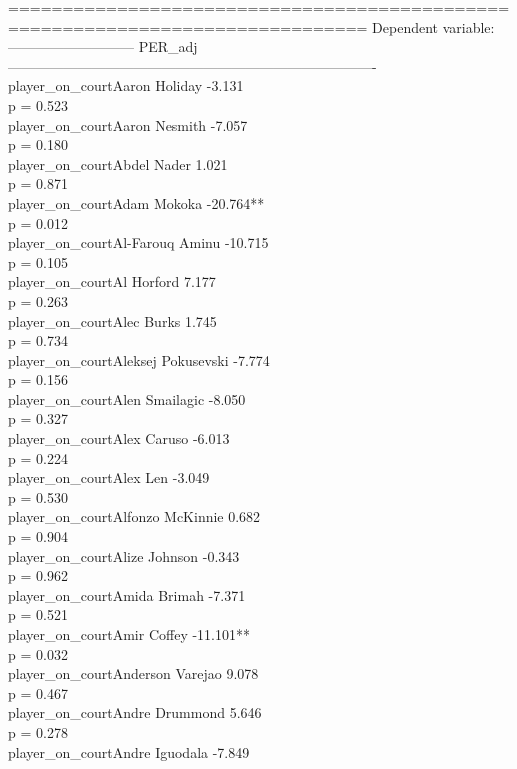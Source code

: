 \documentclass[
  landscape]{article}
\begin{document}
===============================================================================
Dependent variable:\\
--------------------------- PER\_adj\\
-------------------------------------------------------------------------------
player\_on\_courtAaron Holiday -3.131\\
p = 0.523\\
player\_on\_courtAaron Nesmith -7.057\\
p = 0.180\\
player\_on\_courtAbdel Nader 1.021\\
p = 0.871\\
player\_on\_courtAdam Mokoka -20.764**\\
p = 0.012\\
player\_on\_courtAl-Farouq Aminu -10.715\\
p = 0.105\\
player\_on\_courtAl Horford 7.177\\
p = 0.263\\
player\_on\_courtAlec Burks 1.745\\
p = 0.734\\
player\_on\_courtAleksej Pokusevski -7.774\\
p = 0.156\\
player\_on\_courtAlen Smailagic -8.050\\
p = 0.327\\
player\_on\_courtAlex Caruso -6.013\\
p = 0.224\\
player\_on\_courtAlex Len -3.049\\
p = 0.530\\
player\_on\_courtAlfonzo McKinnie 0.682\\
p = 0.904\\
player\_on\_courtAlize Johnson -0.343\\
p = 0.962\\
player\_on\_courtAmida Brimah -7.371\\
p = 0.521\\
player\_on\_courtAmir Coffey -11.101**\\
p = 0.032\\
player\_on\_courtAnderson Varejao 9.078\\
p = 0.467\\
player\_on\_courtAndre Drummond 5.646\\
p = 0.278\\
player\_on\_courtAndre Iguodala -7.849\\
\end{document}

